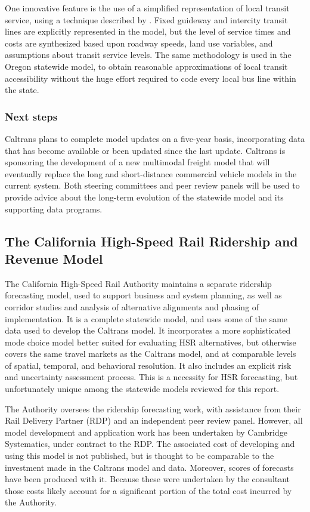 One innovative feature is the use of a simplified representation of local transit service, using a technique described by \cite{circella13}. Fixed guideway and intercity transit lines are explicitly represented in the model, but the level of service times and costs are synthesized based upon roadway speeds, land use variables, and assumptions about transit service levels. The same methodology is used in the Oregon statewide model, to obtain reasonable approximations of local transit accessibility without the huge effort required to code every local bus line within the state.

\subsubsection{Next steps}

Caltrans plans to complete model updates on a five-year basis, incorporating data that has become available or been updated since the last update. Caltrans is sponsoring the development of a new multimodal freight model that will eventually replace the long and short-distance commercial vehicle models in the current system. Both steering committees and peer review panels will be used to provide advice about the long-term evolution of the statewide model and its supporting data programs.

\subsection{The California High-Speed Rail Ridership and Revenue Model}\label{sec:california-hsr-model}

The California High-Speed Rail Authority maintains a separate ridership forecasting model, used to support business and system planning, as well as corridor studies and analysis of alternative alignments and phasing of implementation. It is a complete statewide model, and uses some of the same data used to develop the Caltrans model. It incorporates a more sophisticated mode choice model better suited for evaluating HSR alternatives, but otherwise covers the same travel markets as the Caltrans model, and at comparable levels of spatial, temporal, and behavioral resolution. It also includes an explicit risk and uncertainty assessment process. This is a necessity for HSR forecasting, but unfortunately unique among the statewide models reviewed for this report.

The Authority oversees the ridership forecasting work, with assistance from their Rail Delivery Partner (RDP) and an independent peer review panel. However, all model development and application work has been undertaken by Cambridge Systematics, under contract to the RDP. The associated cost of developing and using this model is not published, but is thought to be comparable to the investment made in the Caltrans model and data. Moreover, scores of forecasts have been produced with it. Because these were undertaken by the consultant those costs likely account for a significant portion of the total cost incurred by the Authority.

